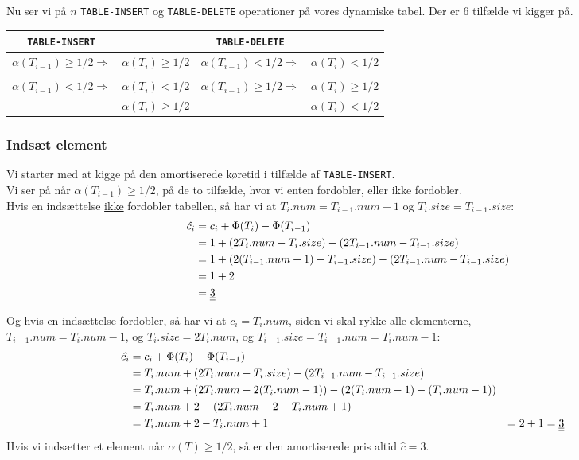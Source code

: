 Nu ser vi på $n$ \texttt{TABLE-INSERT} og \texttt{TABLE-DELETE} operationer på vores dynamiske tabel. Der er 6 tilfælde vi kigger på.\\
\begin{center}
\begin{tabular}{cc|cc}
  \texttt{TABLE-INSERT} &  & \texttt{TABLE-DELETE} & \\
  \hline
  $\alpha(T_{i-1}) \geq 1/2 \Rightarrow$ & $\alpha(T_i) \geq 1/2$ &  $\alpha(T_{i-1}) < 1/2 \Rightarrow$ & $\alpha(T_i) < 1/2$\\
  \\
  $\alpha(T_{i-1}) < 1/2 \Rightarrow$ & $\alpha(T_i) < 1/2$ & $\alpha(T_{i-1}) \geq 1/2 \Rightarrow$ & $\alpha(T_i) \geq 1/2$\\
  & $\alpha(T_i) \geq 1/2$ & & $\alpha(T_i) < 1/2$
\end{tabular}
\end{center}

\subsubsection{Indsæt element}
Vi starter med at kigge på den amortiserede køretid i tilfælde af \texttt{TABLE-INSERT}.\\
Vi ser på når  $\alpha(T_{i-1}) \geq 1/2$, på de to tilfælde, hvor vi enten fordobler, eller ikke fordobler.\\

Hvis en indsættelse \underline{ikke} fordobler tabellen, så har vi at $T_i.num = T_{i-1}.num + 1$ og $T_i.size = T_{i-1}.size$:
\begin{align*}
  \hat{c_i} &= c_i + \Phi(T_i) - \Phi(T_{i-1})\\
            &= 1 + (2T_i.num - T_i.size) - (2T_{i-1}.num - T_{i-1}.size)\\
            &= 1 + (2(T_{i-1}.num + 1) - T_{i-1}.size) - (2T_{i-1}.num - T_{i-1}.size)\\
            &= 1 + 2\\
            &= \underline{\underline{3}}
\end{align*}

Og hvis en indsættelse fordobler, så har vi at $c_i = T_i.num$, siden vi skal rykke alle elementerne,\\
$T_{i-1}.num = T_{i}.num - 1$, og $T_i.size = 2T_{i}.num$, og $T_{i-1}.size = T_{i-1}.num = T_i.num - 1$:
\begin{align*}
  \hat{c_i} &= c_i + \Phi(T_i) - \Phi(T_{i-1})\\
            &= T_i.num + (2T_i.num - T_i.size) - (2T_{i-1}.num - T_{i-1}.size)\\
            &= T_i.num + (2T_i.num - 2(T_i.num - 1)) - (2(T_i.num - 1) - (T_i.num - 1))\\
            &= T_i.num + 2  - (2T_i.num - 2 - T_i.num + 1)\\
            &= T_i.num + 2 - T_i.num + 1
            &= 2 + 1
            &= \underline{\underline{3}}
\end{align*}
Hvis vi indsætter et element når $\alpha(T) \geq 1/2$, så er den amortiserede pris altid $\hat{c} = 3$.\\

